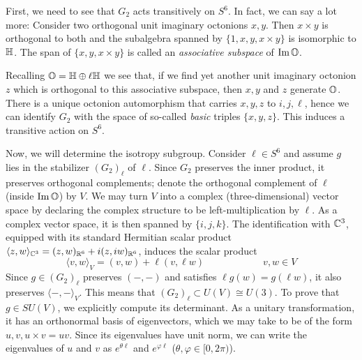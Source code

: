 \begin{myproof}
	First, we need to see that $G_2$ acts transitively on $S^6$. In fact, we can say a lot more: Consider two orthogonal unit imaginary octonions $x,y$. Then $x\times y$ is orthogonal to both and the subalgebra spanned by $\{1,x,y,x\times y\}$ is isomorphic to $\mathbb{H}$. The span of $\{x,y,x\times y\}$ is called an \emph{associative subspace} of $\operatorname{Im} \mathbb{O}$. 
	
	Recalling $\mathbb{O}=\mathbb{H}\oplus\ell\mathbb{H}$ we see that, if we find yet another unit imaginary octonion $z$ which is orthogonal to this associative subspace, then $x,y$ and $z$ generate $\mathbb{O}$. There is a unique octonion automorphism that carries $x,y,z$ to $i,j,\ell$, hence we can identify $G_2$ with the space of so-called \emph{basic} triples $\{x,y,z\}$. This induces a transitive action on $S^6$.
	
	Now, we will determine the isotropy subgroup. Consider $\ell\in S^6$ and assume $g$ lies in the stabilizer $(G_2)_\ell$ of $\ell$. Since $G_2$ preserves the inner product, it preserves orthogonal complements; denote the orthogonal complement of $\ell$ (inside $\operatorname{Im}\mathbb{O}$) by $V$. We may turn $V$ into a complex (three-dimensional) vector space by declaring the complex structure to be left-multiplication by $\ell$. As a complex vector space, it is then spanned by $\{i,j,k\}$. The identification with $\mathbb{C}^3$, equipped with its standard Hermitian scalar product $\langle z,w\rangle_{\mathbb{C}^3}=(z,w)_{\mathbb{R}^6}+i(z,iw)_{\mathbb{R}^6}$, induces the scalar product
	\begin{equation*}
		\langle v,w\rangle_V=(v,w)+\ell (v,\ell w)\qquad \qquad \qquad v,w\in V
	\end{equation*}
	Since $g\in (G_2)_\ell$ preserves $(-,-)$ and satisfies $\ell g(w)=g(\ell w)$, it also preserves $\langle -,-\rangle_V$. This means that $(G_2)_\ell\subset U(V)\cong U(3)$. To prove that $g\in SU(V)$, we explicitly compute its determinant. As a unitary transformation, it has an orthonormal basis of eigenvectors, which we may take to be of the form $u,v,u\times v=uv$. Since its eigenvalues have unit norm, we can write the eigenvalues of $u$ and $v$ as $e^{\theta\ell}$ and $e^{\varphi\ell}$ ($\theta,\varphi\in [0,2\pi)$). 
	

\end{myproof}
